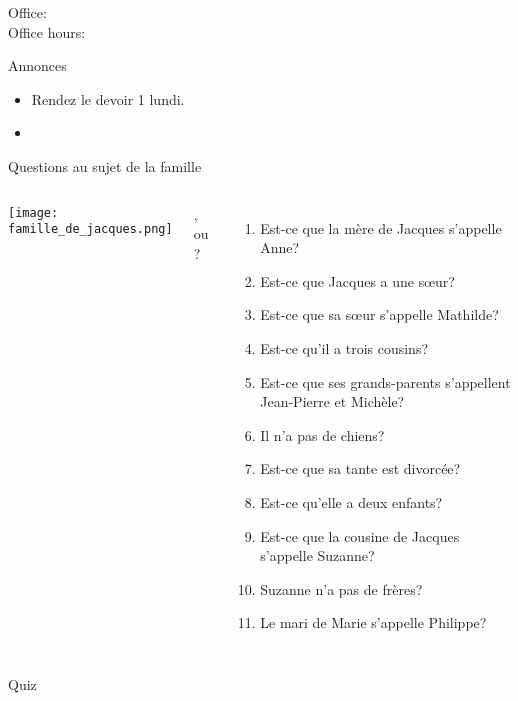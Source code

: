 \documentclass{beamer}
\subtitle[Oui ou non]{Les questions oui ou non}
\begin{document}
  \begin{frame}
    \titlepage
    \tiny{Office: \\
          Office hours: }
  \end{frame}

  \begin{frame}{Annonces}
    \begin{itemize}
      \item Rendez le devoir 1 lundi.
      \item[] 
    \end{itemize}
  \end{frame}

  \begin{frame}{Questions au sujet de la famille}
    \begin{columns}[T]
        \texttt{[image: famille\_de\_jacques.png]}
        {\scriptsize
          ,  ou ?
          \begin{enumerate}
            \item Est-ce que la mère de Jacques s'appelle Anne?
            \item Est-ce que Jacques a une sœur?
            \item Est-ce que sa sœur s'appelle Mathilde?
            \item Est-ce qu'il a trois cousins?
            \item Est-ce que ses grands-parents s'appellent Jean-Pierre et Michèle?
            \item Il n'a pas de chiens?
            \item Est-ce que sa tante est divorcée?
            \item Est-ce qu'elle a deux enfants?
            \item Est-ce que la cousine de Jacques s'appelle Suzanne?
            \item Suzanne n'a pas de frères?
            \item Le mari de Marie s'appelle Philippe?
          \end{enumerate}
        }
    \end{columns}
  \end{frame}

  \begin{frame}{}
    \begin{center}
      \Large Quiz
    \end{center}
  \end{frame}
\end{document}
